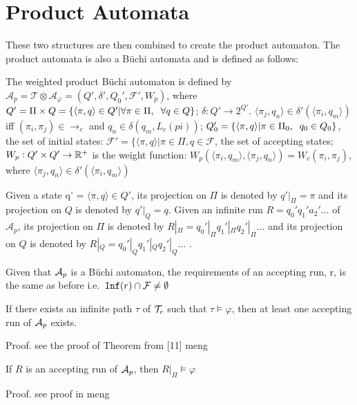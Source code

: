 \section{Product Automata}
These two structures are then combined to create the product automaton. The product automata is also a B\"{u}chi automata and is defined as follows:
\begin{definition}
The weighted product B\"{u}chi automaton is defined by $\mathcal{A}_p = \mathcal{T} \otimes \mathcal{A}_\varphi = (Q', \delta', Q_0', \mathcal{F}', W_p)$, where $Q' = \Pi \times Q = \{ \langle \pi, q \rangle \in Q' | \forall \pi \in \Pi, \hspace{0.2cm} \forall q \in Q \}$; $\delta: Q' \rightarrow 2^{Q'}$. $\langle \pi_j, q_n \rangle \in \delta' (\langle \pi_i, q_m \rangle )$ iff $(\pi_i , \pi_j ) \in \rightarrow_c$ and $q_n \in \delta (q_m, L_c(pi))$; $Q_0' = \{ \langle \pi , q \rangle | \pi \in \Pi_0, \hspace{0.2cm} q_0 \in Q_0\}$, the set of initial states: $\mathcal{F}' = \{ \langle \pi, q \rangle | \pi \in \Pi, q \in \mathcal{F}$, the set of accepting states; $W_p: Q' \times Q' \rightarrow \mathbb{R}^+$ is the weight function: $W_p(\langle \pi_i, q_m \rangle , \langle \pi_j, q_n \rangle ) = W_c (\pi_i, \pi_j)$, where $\langle \pi_j, q_n \rangle \in \delta' ( \langle \pi_i, q_m \rangle )$
\end{definition} 

Given a state q' = $\langle \pi, q \rangle \in Q'$, its projection on $\Pi$ is denoted by $q'|_\Pi = \pi$ and its projection on $Q$ is denoted by $q'|_Q = q$. Given an infinite run $R = q_0' q_1' a_2' \dots$ of $\mathcal{A}_p$, its projection on $\Pi$ is denoted by $R|_\Pi = q_0'|_\Pi q_1'|_\Pi q_2'|_\Pi \dots$ and its projection on $Q$ is denoted by $R|_Q  = q_0'|_Q q_1'|_Q q_2'|_Q \dots$ \cite{guo15}. 

Given that $\mathcal{A}_p$ is a B\"{u}chi automaton, the requirements of an accepting run, r, is the same as before i.e.\ $\texttt{Inf}(r) \cap \mathcal{F} \neq \emptyset$

\begin{lemma}
If there exists an infinite path $\tau$ of $\mathcal{T}_c$ such that $\tau \models \varphi$, then at least one accepting run of $\mathcal{A}_p$ exists.
\end{lemma}
Proof. see the proof of Theorem from [11] meng

\begin{lemma}
\label{lemma1}
If $R$ is an accepting run of $\mathcal{A}_p$, then $R|_\Pi \models \varphi$ 
\end{lemma}
Proof. see proof in meng

